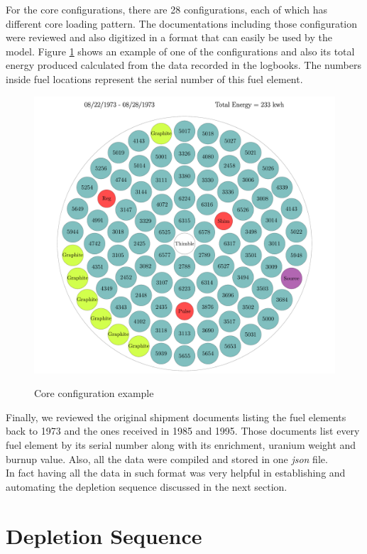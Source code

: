 \documentclass[review,number,sort&compress,12pt]{elsarticle}
\begin{document}
For the core configurations, there are 28 configurations, each of which has different core loading pattern. The documentations including those configuration were reviewed and also digitized in a format that can easily be used by the model.
Figure \ref{fig:coreii1_config} shows an example of one of the configurations and also its total energy produced calculated from the data recorded in the logbooks. The numbers inside fuel locations represent the serial number of this fuel element.

\begin{figure}[htp]
\centering
\includegraphics[scale=0.3]{coreii1.pdf}\\
\caption{Core configuration example}
\label{fig:coreii1_config}
\end{figure}

Finally, we reviewed the original shipment documents listing the fuel elements back to 1973 and the ones received in 1985 and 1995. Those documents list every fuel element by its serial number along with its enrichment, uranium weight and burnup value. Also, all the data were compiled and stored in one \emph{json} file.\\
In fact having all the data in such format was very helpful in establishing and automating the depletion sequence discussed in the next section.


\section{Depletion Sequence}
\end{document}
